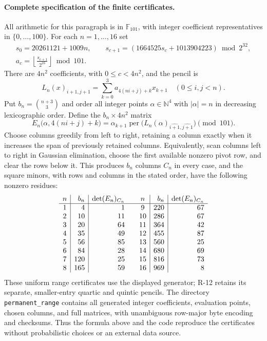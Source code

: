 \documentclass[11pt,a4paper]{article}
\theoremstyle{definition}\newtheorem{definition}{Definition}
\begin{document}
\paragraph{Complete specification of the finite certificates.}
All arithmetic for this paragraph is in $\mathbb F_{101}$, with
integer coefficient representatives in $\{0,\ldots,100\}$.
For each $n=1,\ldots,16$ set
\[
\begin{gathered}
 s_0=20261121+1009n,\qquad
 s_{c+1}=(1664525s_c+1013904223)\bmod2^{32},\\
 a_c=\left\lfloor\frac{s_{c+1}}{2^{16}}\right\rfloor\bmod101.
\end{gathered}
\]
There are $4n^2$ coefficients, with $0\leq c<4n^2$, and the
pencil is
\[
 L_n(x)_{i+1,j+1}=\sum_{k=0}^3a_{4(ni+j)+k}x_{k+1}
 \quad(0\leq i,j<n).
\]
Put $b_n=\binom{n+3}{3}$ and order all integer points
$\alpha\in\mathbb N^4$ with $|\alpha|=n$ in decreasing
lexicographic order. Define the $b_n\times4n^2$ matrix
\begin{equation}\label{R13:evaluationmatrix}
 E_n\bigl(\alpha,4(ni+j)+k\bigr)
 =\alpha_{k+1}\operatorname{per}
   \bigl(L_n(\alpha)_{\widehat{i+1},\widehat{j+1}}\bigr)
 \pmod{101}.
\end{equation}
Choose columns greedily from left to right, retaining a column
exactly when it increases the span of previously retained columns.
Equivalently, scan columns left to right in Gaussian elimination,
choose the first available nonzero pivot row, and clear the rows
below it. This produces $b_n$ columns $C_n$ in every case, and the
square minors, with rows and columns in the stated order, have
the following nonzero residues:
\[
\begin{array}{c|r|r@{\qquad}c|r|r}
n&b_n&\det(E_n)_{C_n}&n&b_n&\det(E_n)_{C_n}\\\hline
1&4&1&9&220&67\\
2&10&11&10&286&67\\
3&20&64&11&364&42\\
4&35&49&12&455&87\\
5&56&85&13&560&25\\
6&84&28&14&680&69\\
7&120&25&15&816&73\\
8&165&59&16&969&8
\end{array}
\]
These uniform range certificates use the displayed generator;
R-12 retains its separate, smaller-entry quartic and quintic pencils.
The directory \nolinkurl{permanent_range} contains all generated
integer coefficients, evaluation points, chosen columns, and full
matrices, with unambiguous row-major byte encoding and checksums.
Thus the formula above and the code reproduce the certificates
without probabilistic choices or an external data source.
\end{document}
